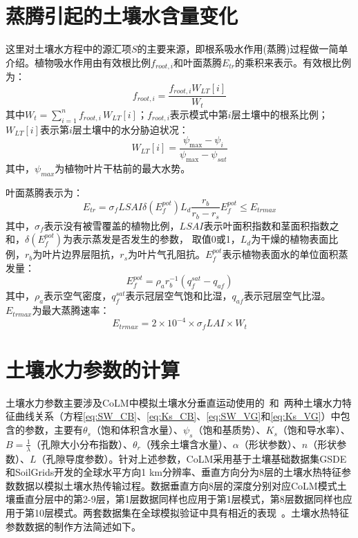 \section{蒸腾引起的土壤水含量变化}

这里对土壤水方程中的源汇项$S$的主要来源，即根系吸水作用(蒸腾)过程做一简单介绍。植物吸水作用由有效根比例$f_{root,i}$和叶面蒸腾$E_{tr}$的乘积来表示\citep{dai2003common}。有效根比例为：
\begin{equation}
{f}_{ {root }, {i}}=\frac{{f}_{{root}, {i}} {W}_{{LT}}[{i}]}{W_{t}}
\end{equation}
其中$W_{t} = \sum_{i=1}^{n}{f_{root,i\ }W_{LT}\left[i\right]}$；$f_{root,i}$表示模式中第$i$层土壤中的根系比例；$W_{LT}[i]$表示第$i$层土壤中的水分胁迫状况：
\begin{equation}
{W}_{{LT}}[{i}]=\frac{\psi_{\max }-\psi_{i}}{\psi_{\max }-\psi_{sat}}
\end{equation}
其中，$\psi_{max}$为植物叶片干枯前的最大水势。

叶面蒸腾表示为：
\begin{equation}
{E}_{{tr}}=\sigma_{{f}} LSAI \delta\left({E}_{{f}}^{{pot}}\right) {L}_{{d}} \frac{{r}_{{b}}}{{r}_{{b}}-{r}_{{s}}} {E}_{{f}}^{{pot}} \leqslant {E}_{{trmax}}
\end{equation}
其中，$\sigma_f$表示没有被雪覆盖的植物比例，$LSAI$表示叶面积指数和茎面积指数之和，$\delta\left(E_f^{pot}\right)$为表示蒸发是否发生的参数，
取值0或1，$L_d$为干燥的植物表面比例，$r_b$为叶片边界层阻抗，$r_s$为叶片气孔阻抗。$E_f^{pot}$表示植物表面水的单位面积蒸发量：
\begin{equation}
{E}_{{f}}^{{pot}}=\rho_{{a}} {r}_{{b}}^{-1}\left({q}_{{f}}^{{sat}}-{q}_{{af}}\right)
\end{equation}
其中，$\rho_a$表示空气密度，$q_f^{sat}$表示冠层空气饱和比湿，$q_{af}$表示冠层空气比湿。$E_{trmax}$为最大蒸腾速率：
\begin{equation}
{E}_{ {trmax }}=2 \times 10^{-4} \times \sigma_{{f}} L A I \times W_{t}
\end{equation}

\section{土壤水力参数的计算}\label{sec_hydropar}
土壤水力参数主要涉及CoLM中模拟土壤水分垂直运动使用的~\citet{campbell1974}和~\citet{van1980closed}两种土壤水力特征曲线关系（方程\eqref{eq:SW_CB}、\eqref{eq:Ks_CB}、\eqref{eq:SW_VG}和\eqref{eq:Ks_VG}）中包含的参数，主要有$\theta_s$（饱和体积含水量）、$\psi_s$（饱和基质势）、$K_s$（饱和导水率）、$B=\frac{1}{\lambda}$（孔隙大小分布指数）、$\theta_r$（残余土壤含水量）、$\alpha$（形状参数）、$n$（形状参数）、$L$（孔隙导度参数）。针对上述参数，CoLM采用基于土壤基础数据集GSDE和SoilGrids开发的全球水平方向1 km分辨率、垂直方向分为8层的土壤水热特征参数数据以模拟土壤水热传输过程。数据垂直方向8层的深度分别对应CoLM模式土壤垂直分层中的第2-9层，第1层数据同样也应用于第1层模式，第8层数据同样也应用于第10层模式。两套数据集在全球模拟验证中具有相近的表现~\citep{李文耀2020土壤}。土壤水热特征参数数据的制作方法简述如下。

